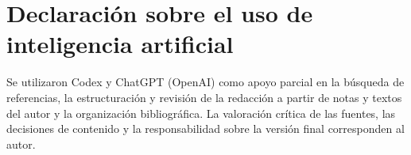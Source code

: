 \section*{Declaración sobre el uso de inteligencia artificial}
\label{sec:uso_ia}
Se utilizaron Codex y ChatGPT (OpenAI) como apoyo parcial en la búsqueda de referencias, la estructuración y revisión de la redacción a partir de notas y textos del autor y la organización bibliográfica. La valoración crítica de las fuentes, las decisiones de contenido y la responsabilidad sobre la versión final corresponden al autor.
